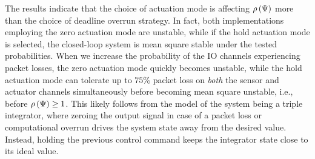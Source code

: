 The results indicate that the choice of actuation mode is affecting $\rho\left( \Psi \right)$ more than the choice of deadline overrun strategy.
In fact, both implementations employing the zero actuation mode are unstable, while if the hold actuation mode is selected, the closed-loop system is mean square stable under the tested probabilities.
When we increase the probability of the IO channels experiencing packet losses, the zero actuation mode quickly becomes unstable, while the hold actuation mode can tolerate up to $75$\% packet loss on \emph{both} the sensor and actuator channels simultaneously before becoming mean square unstable, i.e., before $\rho\left( \Psi \right) \geq 1$.
This likely follows from the model of the system being a triple integrator, where zeroing the output signal in case of a packet loss or computational overrun drives the system state away from the desired value.
Instead, holding the previous control command keeps the integrator state close to its ideal value.  
